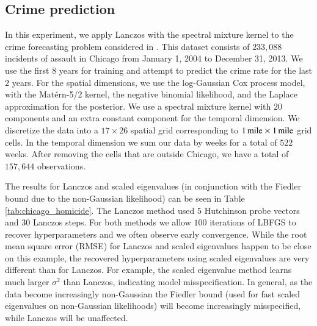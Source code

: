 \subsection{Crime prediction}
In this experiment, we apply Lanczos with the spectral mixture kernel to the
crime forecasting problem considered in \cite{flaxman2015fast}. This dataset
consists of $233,088$ incidents of assault in Chicago from January 1, 2004 to
December 31, 2013. We use the first $8$ years for training and attempt to
predict the crime rate for the last $2$ years. For the spatial dimensions, we
use the log-Gaussian Cox process model, with the Mat\'ern-5/2 kernel, the
negative binomial likelihood, and the Laplace approximation for the posterior.
We use a spectral mixture kernel with $20$ components and an extra constant
component for the temporal dimension. We discretize the data into a $17 \times
26$ spatial grid corresponding to $1\operatorname{mile}\mathrel{\times}1\operatorname{mile}$ grid cells. In
the temporal
dimension we sum our data by weeks for a total of $522$ weeks. After removing
the cells that are outside Chicago, we have a total of $157,644$ observations.

The results for Lanczos and scaled eigenvalues (in conjunction with the Fiedler
bound due to the non-Gaussian likelihood) can be seen in Table 
\ref{tab:chicago_homicide}. The Lanczos method used $5$ Hutchinson probe vectors
and $30$ Lanczos steps. For both methods we allow $100$ iterations of LBFGS to
recover hyperparameters and we often observe early convergence. While the root
mean square error (RMSE) for Lanczos and scaled eigenvalues happen to be close
on this example, the recovered hyperparameters using scaled eigenvalues are very
different than for Lanczos. For example, the scaled eigenvalue method learns
much larger $\sigma^2$ than Lanczos, indicating model misspecification. In
general, as the data become increasingly non-Gaussian the Fiedler bound (used
for fast scaled eigenvalues on non-Gaussian likelihoods) will become
increasingly misspecified, while Lanczos will be unaffected.

